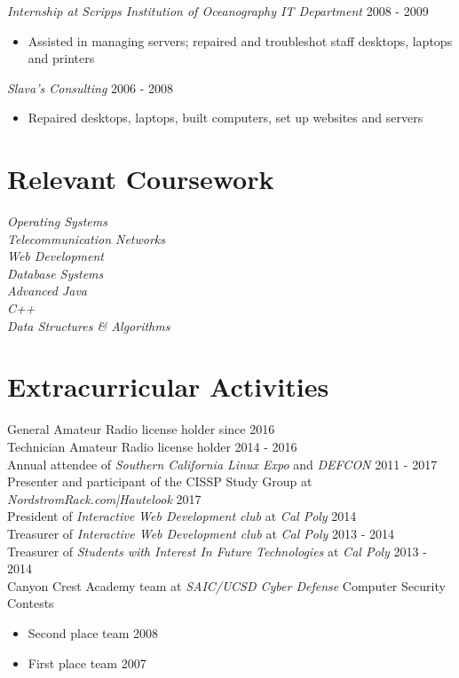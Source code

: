 \documentclass[line]{docs/resume/res}
\begin{document}
\begin{resume}

  {\sl Internship at Scripps Institution of Oceanography IT Department} \hfill 2008 - 2009
  \begin{itemize} \itemsep -2pt
    \item Assisted in managing servers; repaired and troubleshot staff desktops, laptops and printers
  \end{itemize}

  {\sl Slava's Consulting} \hfill 2006 - 2008
  \begin{itemize} \itemsep -2pt
    \item Repaired desktops, laptops, built computers, set up websites and servers
  \end{itemize}

\section{Relevant Coursework}
  {\sl Operating Systems } \\
  {\sl Telecommunication Networks } \\
  {\sl Web Development } \\
  {\sl Database Systems } \\
  {\sl Advanced Java} \\
  {\sl C++} \\
  {\sl Data Structures \& Algorithms}

\section{Extracurricular Activities}
  General Amateur Radio license holder since \hfill 2016 \\
  Technician Amateur Radio license holder \hfill 2014 - 2016 \\
  Annual attendee of {\it Southern California Linux Expo} and {\it DEFCON} \hfill 2011 - 2017 \\
  Presenter and participant of the CISSP Study Group at {\it NordstromRack.com|Hautelook} \hfill 2017 \\
  President of {\it Interactive Web Development club} at {\it Cal Poly} \hfill 2014 \\
  Treasurer of {\it Interactive Web Development club} at {\it Cal Poly} \hfill 2013 - 2014 \\
  Treasurer of {\it Students with Interest In Future Technologies} at {\it Cal Poly} \hfill 2013 - 2014 \\
  Canyon Crest Academy team at {\it SAIC/UCSD Cyber Defense} Computer Security Contests
  \begin{itemize} \itemsep -2pt
    \item Second place team \hfill 2008
    \item First place team \hfill 2007
  \end{itemize}

\end{resume}
\end{document}
